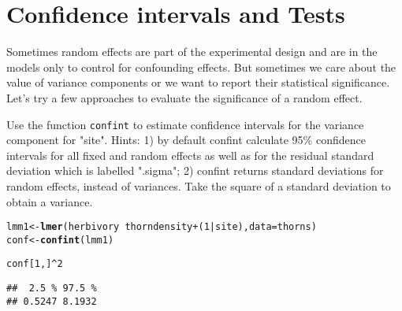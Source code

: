 \documentclass[12pt,a4paper]{scrartcl}\usepackage[]{graphicx}\usepackage[]{color}
\makeatletter
\newcommand{\hlnum}[1]{\textcolor[rgb]{0.686,0.059,0.569}{#1}}%
\newcommand{\hlopt}[1]{\textcolor[rgb]{0,0,0}{#1}}%
\newcommand{\hlstd}[1]{\textcolor[rgb]{0.345,0.345,0.345}{#1}}%
\newcommand{\hlkwb}[1]{\textcolor[rgb]{0.69,0.353,0.396}{#1}}%
\newcommand{\hlkwc}[1]{\textcolor[rgb]{0.333,0.667,0.333}{#1}}%
\newcommand{\hlkwd}[1]{\textcolor[rgb]{0.737,0.353,0.396}{\textbf{#1}}}%
\newenvironment{kframe}{%
 \def\at@end@of@kframe{}%
 \ifinner\ifhmode%
  \def\at@end@of@kframe{\end{minipage}}%
  \begin{minipage}{\columnwidth}%
 \fi\fi%
 \def\FrameCommand##1{\hskip\@totalleftmargin \hskip-\fboxsep
 \colorbox{shadecolor}{##1}\hskip-\fboxsep
     \hskip-\linewidth \hskip-\@totalleftmargin \hskip\columnwidth}%
 \MakeFramed {\advance\hsize-\width
   \@totalleftmargin\z@ \linewidth\hsize
   \@setminipage}}%
 {\par\unskip\endMakeFramed%
 \at@end@of@kframe}
\newenvironment{knitrout}{}{} %
\makeatother
\begin{document}
\section{Confidence intervals and Tests}
Sometimes random effects are part of the experimental design and are in the models only to control for confounding effects. But sometimes we care about the value of variance components or we want to report their statistical significance. Let's try a few approaches to evaluate the significance of a random effect. 


\begin{Exercise}[difficulty=1, title={CI for variance components in lme4}]
Use the function \texttt{confint} to estimate confidence intervals for the variance component for "site". Hints: 1) by default confint calculate 95\% confidence intervals for all fixed and random effects as well as for the residual standard deviation which is labelled ".sigma"; 2) confint returns standard deviations for random effects, instead of variances. Take the square of a standard deviation to obtain a variance.
\end{Exercise}
\begin{Answer}
\begin{knitrout}
\color{fgcolor}\begin{kframe}
\begin{alltt}
\hlstd{lmm1} \hlkwb{<-} \hlkwd{lmer}\hlstd{(herbivory} \hlopt{~} \hlstd{thorndensity} \hlopt{+} \hlstd{(}\hlnum{1}\hlopt{|}\hlstd{site),} \hlkwc{data}\hlstd{=thorns)}
\hlstd{conf} \hlkwb{<-} \hlkwd{confint}\hlstd{(lmm1)}
\end{alltt}


{\ttfamily\noindent\itshape\color{messagecolor}{\#\# Computing profile confidence intervals ...}}\begin{alltt}
\hlstd{conf[}\hlnum{1}\hlstd{,]}\hlopt{^}\hlnum{2}
\end{alltt}
\begin{verbatim}
##  2.5 % 97.5 % 
## 0.5247 8.1932
\end{verbatim}
\end{kframe}
\end{knitrout}
\end{Answer}
\end{document}
